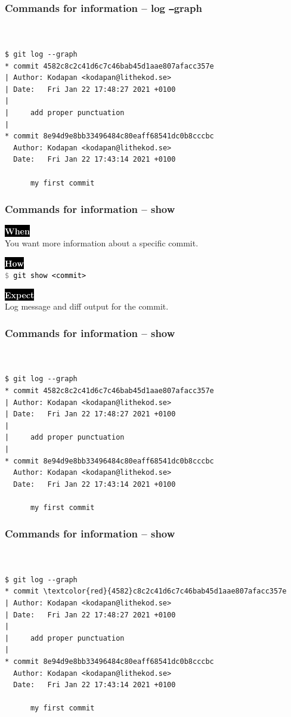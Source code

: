 \documentclass{beamer}
\newcommand{\keyword}[1]{\hspace{-1.0em}\colorbox{black}{\textcolor{white}{\textbf{#1}\vphantom{Ep}}}\vspace{0.2em}} %
\newcommand{\command}[1]{\colorbox{black!90!white!10!}{\vphantom{Ep}\texttt{\textcolor{gray}{\$} \textcolor{black}{#1}}}}
\begin{document}
\begin{frame}[fragile]
  \frametitle{Commands for information -- log \texttt{--}graph}
\begin{Verbatim}[commandchars=\\\{\}]


$ git log --graph
* commit 4582c8c2c41d6c7c46bab45d1aae807afacc357e
| Author: Kodapan <kodapan@lithekod.se>
| Date:   Fri Jan 22 17:48:27 2021 +0100
| 
|     add proper punctuation
| 
* commit 8e94d9e8bb33496484c80eaff68541dc0b8cccbc
  Author: Kodapan <kodapan@lithekod.se>
  Date:   Fri Jan 22 17:43:14 2021 +0100
  
      my first commit
\end{Verbatim}
\end{frame}

\begin{frame}
  \frametitle{Commands for information -- show}

  \keyword{When}\\
  You want more information about a specific commit.
  \vspace{0.5em}

  \keyword{How}\\
  \command{git show <commit>}
  \vspace{0.5em}

  \keyword{Expect}\\
  Log message and diff output for the commit.
\end{frame}

\begin{frame}[fragile]
  \frametitle{Commands for information -- show}
\begin{Verbatim}[commandchars=\\\{\}]


$ git log --graph
* commit 4582c8c2c41d6c7c46bab45d1aae807afacc357e
| Author: Kodapan <kodapan@lithekod.se>
| Date:   Fri Jan 22 17:48:27 2021 +0100
| 
|     add proper punctuation
| 
* commit 8e94d9e8bb33496484c80eaff68541dc0b8cccbc
  Author: Kodapan <kodapan@lithekod.se>
  Date:   Fri Jan 22 17:43:14 2021 +0100
  
      my first commit
\end{Verbatim}
\end{frame}

\begin{frame}[fragile]
  \frametitle{Commands for information -- show}
\begin{Verbatim}[commandchars=\\\{\}]


$ git log --graph
* commit \textcolor{red}{4582}c8c2c41d6c7c46bab45d1aae807afacc357e
| Author: Kodapan <kodapan@lithekod.se>
| Date:   Fri Jan 22 17:48:27 2021 +0100
| 
|     add proper punctuation
| 
* commit 8e94d9e8bb33496484c80eaff68541dc0b8cccbc
  Author: Kodapan <kodapan@lithekod.se>
  Date:   Fri Jan 22 17:43:14 2021 +0100
  
      my first commit
\end{Verbatim}
\end{frame}
\end{document}
